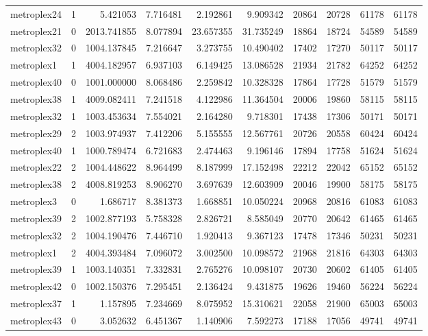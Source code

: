 \begin{longtable}{|l|r|r|r|r|r|r|r|r|r|}
metroplex24 & 1 & 5.421053 & 7.716481 & 2.192861 & 9.909342 & 20864 & 20728 & 61178 & 61178 \\
metroplex21 & 0 & 2013.741855 & 8.077894 & 23.657355 & 31.735249 & 18864 & 18724 & 54589 & 54589 \\
metroplex32 & 0 & 1004.137845 & 7.216647 & 3.273755 & 10.490402 & 17402 & 17270 & 50117 & 50117 \\
metroplex1 & 1 & 4004.182957 & 6.937103 & 6.149425 & 13.086528 & 21934 & 21782 & 64252 & 64252 \\
metroplex40 & 0 & 1001.000000 & 8.068486 & 2.259842 & 10.328328 & 17864 & 17728 & 51579 & 51579 \\
metroplex38 & 1 & 4009.082411 & 7.241518 & 4.122986 & 11.364504 & 20006 & 19860 & 58115 & 58115 \\
metroplex32 & 1 & 1003.453634 & 7.554021 & 2.164280 & 9.718301 & 17438 & 17306 & 50171 & 50171 \\
metroplex29 & 2 & 1003.974937 & 7.412206 & 5.155555 & 12.567761 & 20726 & 20558 & 60424 & 60424 \\
metroplex40 & 1 & 1000.789474 & 6.721683 & 2.474463 & 9.196146 & 17894 & 17758 & 51624 & 51624 \\
metroplex22 & 2 & 1004.448622 & 8.964499 & 8.187999 & 17.152498 & 22212 & 22042 & 65152 & 65152 \\
metroplex38 & 2 & 4008.819253 & 8.906270 & 3.697639 & 12.603909 & 20046 & 19900 & 58175 & 58175 \\
metroplex3 & 0 & 1.686717 & 8.381373 & 1.668851 & 10.050224 & 20968 & 20816 & 61083 & 61083 \\
metroplex39 & 2 & 1002.877193 & 5.758328 & 2.826721 & 8.585049 & 20770 & 20642 & 61465 & 61465 \\
metroplex32 & 2 & 1004.190476 & 7.446710 & 1.920413 & 9.367123 & 17478 & 17346 & 50231 & 50231 \\
metroplex1 & 2 & 4004.393484 & 7.096072 & 3.002500 & 10.098572 & 21968 & 21816 & 64303 & 64303 \\
metroplex39 & 1 & 1003.140351 & 7.332831 & 2.765276 & 10.098107 & 20730 & 20602 & 61405 & 61405 \\
metroplex42 & 0 & 1002.150376 & 7.295451 & 2.136424 & 9.431875 & 19626 & 19460 & 56224 & 56224 \\
metroplex37 & 1 & 1.157895 & 7.234669 & 8.075952 & 15.310621 & 22058 & 21900 & 65003 & 65003 \\
metroplex43 & 0 & 3.052632 & 6.451367 & 1.140906 & 7.592273 & 17188 & 17056 & 49741 & 49741 \\

\end{longtable}
